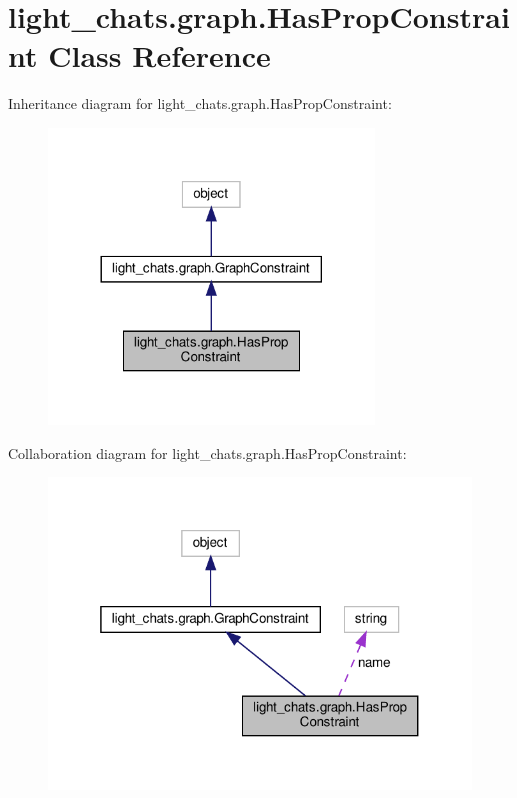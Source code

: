 \hypertarget{classlight__chats_1_1graph_1_1HasPropConstraint}{}\section{light\+\_\+chats.\+graph.\+Has\+Prop\+Constraint Class Reference}
\label{classlight__chats_1_1graph_1_1HasPropConstraint}


Inheritance diagram for light\+\_\+chats.\+graph.\+Has\+Prop\+Constraint\+:
\nopagebreak
\begin{figure}[H]
\begin{center}
\leavevmode
\includegraphics[width=245pt]{classlight__chats_1_1graph_1_1HasPropConstraint__inherit__graph}
\end{center}
\end{figure}


Collaboration diagram for light\+\_\+chats.\+graph.\+Has\+Prop\+Constraint\+:
\nopagebreak
\begin{figure}[H]
\begin{center}
\leavevmode
\includegraphics[width=319pt]{classlight__chats_1_1graph_1_1HasPropConstraint__coll__graph}
\end{center}
\end{figure}
